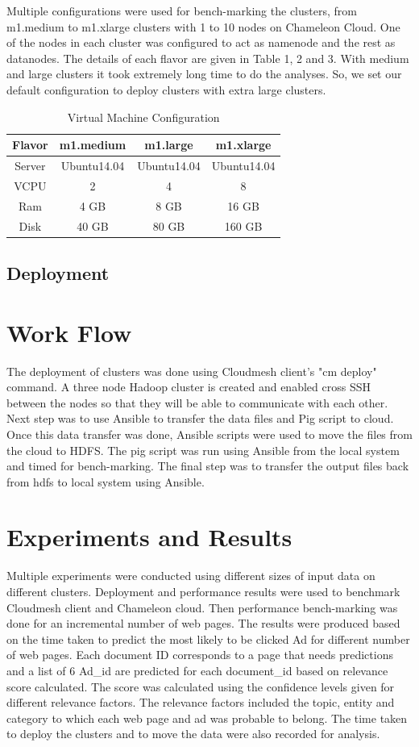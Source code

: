 \documentclass[9pt,twocolumn,twoside]{../../styles/osajnl}
\begin{document}
Multiple configurations were used for bench-marking the clusters, from m1.medium to m1.xlarge clusters with 1 to 10 nodes on Chameleon Cloud. One of the nodes in each cluster was configured to act as namenode and the rest as datanodes. The details of each flavor are given in Table 1, 2 and 3. With medium and large clusters it took extremely long time to do the analyses. So, we set our default configuration to deploy clusters with extra large clusters.
\begin{table}
\begin{tabular}{|c|c|c|c|}
\hline
    Flavor & m1.medium & m1.large & m1.xlarge \\ \hline
    Server & Ubuntu14.04 & Ubuntu14.04 & Ubuntu14.04 \\ \hline
    VCPU & 2 & 4 & 8 \\\hline
    Ram & 4 GB & 8 GB & 16 GB \\\hline
    Disk & 40 GB & 80 GB & 160 GB \\\hline
\end{tabular}
\caption{Virtual Machine Configuration}
\end{table}
\subsection{Deployment}

\section{Work Flow}
The deployment of clusters was done using Cloudmesh client's "cm deploy" command. A three node Hadoop cluster is created and enabled cross SSH between the nodes so that they will be able to communicate with each other. Next step was to use Ansible to transfer the data files and Pig script to cloud. Once this data transfer was done, Ansible scripts were used to move the files from the cloud to HDFS. The pig script was run using Ansible from the local system and timed for bench-marking. The final step was to transfer the output files back from hdfs to local system using Ansible.

\section{Experiments and Results}
Multiple experiments were conducted using different sizes of input data on different clusters. Deployment and performance results were used to benchmark Cloudmesh client and Chameleon cloud. Then performance bench-marking was done for an incremental number of web pages. The results were produced based on the time taken to predict the most likely to be clicked Ad for different number of web pages. Each document ID corresponds to a page that needs predictions and a list of 6 Ad\_id are predicted for each document\_id based on relevance score calculated. The score was calculated using the confidence levels given for different relevance factors. The relevance factors included the topic, entity and category to which each web page and ad was probable to belong. The time taken to deploy the clusters and to move the data were also recorded for analysis.
\end{document}
